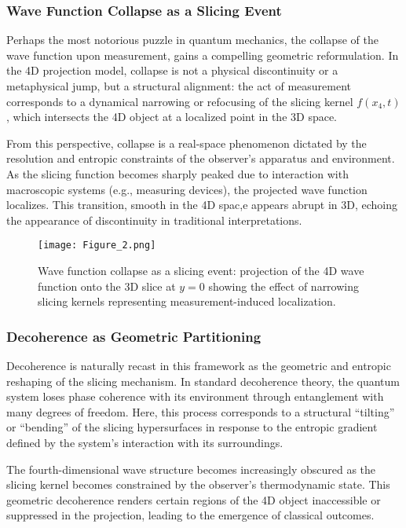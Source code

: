 \documentclass[12pt]{article}
\begin{document}
\subsubsection*{Wave Function Collapse as a Slicing Event}

Perhaps the most notorious puzzle in quantum mechanics, the collapse of the wave function upon measurement, gains a compelling geometric reformulation. In the 4D projection model, collapse is not a physical discontinuity or a metaphysical jump, but a structural alignment: the act of measurement corresponds to a dynamical narrowing or refocusing of the slicing kernel $f(x_4, t)$, which intersects the 4D object at a localized point in the 3D space.

From this perspective, collapse is a real-space phenomenon dictated by the resolution and entropic constraints of the observer’s apparatus and environment. As the slicing function becomes sharply peaked due to interaction with macroscopic systems (e.g., measuring devices), the projected wave function localizes. This transition, smooth in the 4D spac,e appears abrupt in 3D, echoing the appearance of discontinuity in traditional interpretations.
\begin{figure}[htbp]
    \centering
    \texttt{[image: Figure\_2.png]}
    \caption{Wave function collapse as a slicing event: projection of the 4D wave function onto the 3D slice at $y=0$ showing the effect of narrowing slicing kernels representing measurement-induced localization.}
    \label{fig:wave-collapse-slice}
\end{figure}

\subsubsection*{Decoherence as Geometric Partitioning}

Decoherence is naturally recast in this framework as the geometric and entropic reshaping of the slicing mechanism. In standard decoherence theory, the quantum system loses phase coherence with its environment through entanglement with many degrees of freedom. Here, this process corresponds to a structural “tilting” or “bending” of the slicing hypersurfaces in response to the entropic gradient defined by the system’s interaction with its surroundings.

The fourth-dimensional wave structure becomes increasingly obscured as the slicing kernel becomes constrained by the observer’s thermodynamic state. This geometric decoherence renders certain regions of the 4D object inaccessible or suppressed in the projection, leading to the emergence of classical outcomes.
\end{document}
